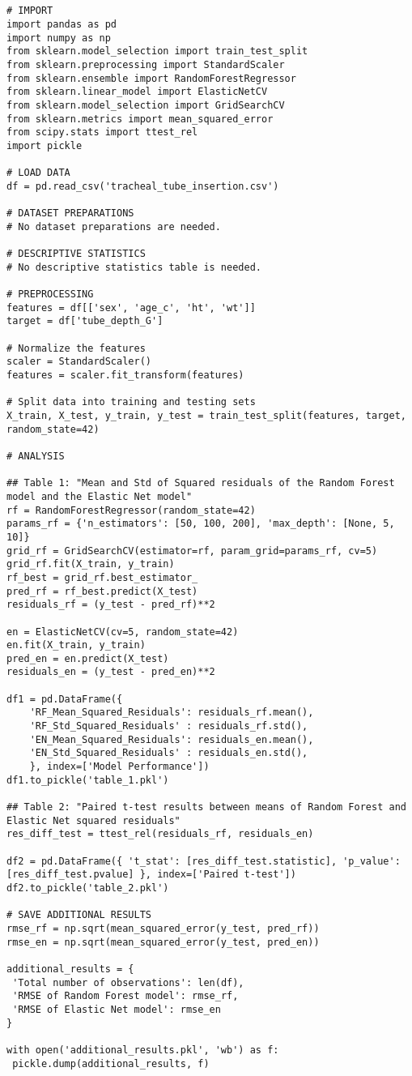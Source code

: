 \documentclass[11pt]{article}
\begin{document}
\begin{verbatim}


# IMPORT
import pandas as pd
import numpy as np
from sklearn.model_selection import train_test_split
from sklearn.preprocessing import StandardScaler
from sklearn.ensemble import RandomForestRegressor
from sklearn.linear_model import ElasticNetCV
from sklearn.model_selection import GridSearchCV
from sklearn.metrics import mean_squared_error
from scipy.stats import ttest_rel
import pickle

# LOAD DATA
df = pd.read_csv('tracheal_tube_insertion.csv')

# DATASET PREPARATIONS
# No dataset preparations are needed.

# DESCRIPTIVE STATISTICS
# No descriptive statistics table is needed.

# PREPROCESSING 
features = df[['sex', 'age_c', 'ht', 'wt']]
target = df['tube_depth_G']

# Normalize the features
scaler = StandardScaler()
features = scaler.fit_transform(features)

# Split data into training and testing sets
X_train, X_test, y_train, y_test = train_test_split(features, target, random_state=42)

# ANALYSIS

## Table 1: "Mean and Std of Squared residuals of the Random Forest model and the Elastic Net model"
rf = RandomForestRegressor(random_state=42)
params_rf = {'n_estimators': [50, 100, 200], 'max_depth': [None, 5, 10]}
grid_rf = GridSearchCV(estimator=rf, param_grid=params_rf, cv=5)
grid_rf.fit(X_train, y_train)
rf_best = grid_rf.best_estimator_
pred_rf = rf_best.predict(X_test)
residuals_rf = (y_test - pred_rf)**2

en = ElasticNetCV(cv=5, random_state=42)
en.fit(X_train, y_train)
pred_en = en.predict(X_test)
residuals_en = (y_test - pred_en)**2

df1 = pd.DataFrame({
    'RF_Mean_Squared_Residuals': residuals_rf.mean(),
    'RF_Std_Squared_Residuals' : residuals_rf.std(),
    'EN_Mean_Squared_Residuals': residuals_en.mean(),
    'EN_Std_Squared_Residuals' : residuals_en.std(),
    }, index=['Model Performance'])
df1.to_pickle('table_1.pkl')

## Table 2: "Paired t-test results between means of Random Forest and Elastic Net squared residuals"
res_diff_test = ttest_rel(residuals_rf, residuals_en)

df2 = pd.DataFrame({ 't_stat': [res_diff_test.statistic], 'p_value': [res_diff_test.pvalue] }, index=['Paired t-test'])
df2.to_pickle('table_2.pkl')

# SAVE ADDITIONAL RESULTS
rmse_rf = np.sqrt(mean_squared_error(y_test, pred_rf))
rmse_en = np.sqrt(mean_squared_error(y_test, pred_en))

additional_results = {
 'Total number of observations': len(df),
 'RMSE of Random Forest model': rmse_rf,
 'RMSE of Elastic Net model': rmse_en
}

with open('additional_results.pkl', 'wb') as f:
 pickle.dump(additional_results, f)


\end{verbatim}
\end{document}
